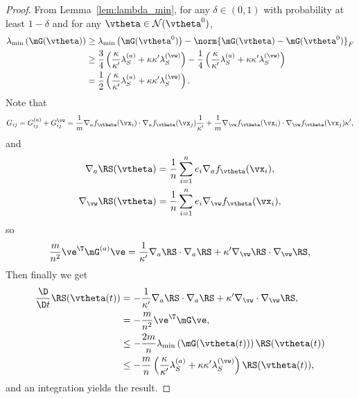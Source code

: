 \documentclass{article}
\begin{document}
\begin{proof}
    From Lemma~\ref{lem:lambda_min}, for any $\delta\in(0,1)$ with probability at least $1-\delta$ and for any $\vtheta\in\mathcal{N}(\vtheta^0)$,
    \begin{equation}
        \begin{aligned}
            \lambda_{\min}\left(\mG(\vtheta)\right)
             & \geq \lambda_{\min}\left(\mG(\vtheta^0)\right) - \norm{\mG(\vtheta) - \mG(\vtheta^0)}_F                                                                                                          \\
             & \geq \frac{3}{4}\left(\frac{\kappa}{\kappa'}\lambda_S^{(a)}+\kappa\kappa'\lambda_S^{(\vw)}\right) - \frac{1}{4}\left(\frac{\kappa}{\kappa'}\lambda_S^{(a)}+\kappa\kappa'\lambda_S^{(\vw)}\right) \\
             & = \frac{1}{2}\left(\frac{\kappa}{\kappa'}\lambda_S^{(a)}+\kappa\kappa'\lambda_S^{(\vw)}\right).
        \end{aligned}
    \end{equation}
    Note that
    \begin{equation}
        G_{ij} = G_{ij}^{(a)}+G^{\vw}_{ij}=\frac{1}{m}\nabla_{a}f_{\vtheta}(\vx_i)\cdot\nabla_{a}f_{\vtheta}(\vx_j)\frac{1}{\kappa'}+\frac{1}{m}\nabla_{\vw}f_{\vtheta}(\vx_i)\cdot\nabla_{\vw}f_{\vtheta}(\vx_j)\kappa',
    \end{equation}
    and
    \begin{equation}
        \begin{aligned}
            \nabla_{a}\RS(\vtheta)   & =\frac{1}{n}\sum_{i=1}^{n}e_i\nabla_{a}f_{\vtheta}(\vx_i),    \\
            \nabla_{\vw}\RS(\vtheta) & = \frac{1}{n}\sum_{i=1}^{n}e_i\nabla_{\vw}f_{\vtheta}(\vx_i),
        \end{aligned}
    \end{equation}
    so
    \begin{equation}
        \frac{m}{n^2}\ve^{\T}\mG^{(a)}\ve=\frac{1}{\kappa'}\nabla_a\RS\cdot\nabla_{a}\RS+\kappa'\nabla_{\vw}\RS\cdot\nabla_{\vw}\RS,
    \end{equation}
    Then finally we get
    \begin{equation}
        \begin{aligned}
            \frac{\D}{\D t}\RS(\vtheta(t))
             & =-\frac{1}{\kappa'}\nabla_a\RS\cdot\nabla_a\RS+\kappa'\nabla_{\vw}\cdot\nabla_{\vw}\RS,                            \\
             & =-\frac{m}{n^2}\ve^{\T}\mG\ve,                                                                                     \\
             & \leq -\frac{2m}{n}\lambda_{\min}\left(\mG(\vtheta(t))\right)\RS(\vtheta(t))                                        \\
             & \leq -\frac{m}{n}\left(\frac{\kappa}{\kappa'}\lambda_S^{(a)}+\kappa\kappa'\lambda_S^{(\vw)}\right)\RS(\vtheta(t)),
        \end{aligned}
    \end{equation}
    and an integration yields the result.
\end{proof}
\end{document}
